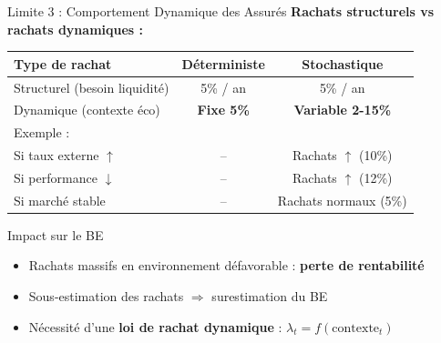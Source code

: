 \documentclass[10pt,aspectratio=169,xcolor={dvipsnames}]{beamer}
\begin{document}
\begin{frame}{Limite 3 : Comportement Dynamique des Assurés}
\textbf{Rachats structurels vs rachats dynamiques :}

\begin{table}
\centering
\small
\begin{tabular}{lcc}
\toprule
\textbf{Type de rachat} & \textbf{Déterministe} & \textbf{Stochastique} \\
\midrule
Structurel (besoin liquidité) & 5\% / an & 5\% / an \\
\rowcolor{yellow!20}
Dynamique (contexte éco) & \textbf{Fixe 5\%} & \textbf{Variable 2-15\%} \\
\midrule
Exemple : & & \\
\quad Si taux externe $\uparrow$ & -- & Rachats $\uparrow$ (10\%) \\
\quad Si performance $\downarrow$ & -- & Rachats $\uparrow$ (12\%) \\
\quad Si marché stable & -- & Rachats normaux (5\%) \\
\bottomrule
\end{tabular}
\end{table}

\vspace{0.3cm}
\begin{alertblock}{Impact sur le BE}
\begin{itemize}
    \item Rachats massifs en environnement défavorable : \textbf{perte de rentabilité}
    \item Sous-estimation des rachats $\Rightarrow$ surestimation du BE
    \item Nécessité d'une \textbf{loi de rachat dynamique} : $\lambda_t = f(\text{contexte}_t)$
\end{itemize}
\end{alertblock}
\end{frame}
\end{document}
